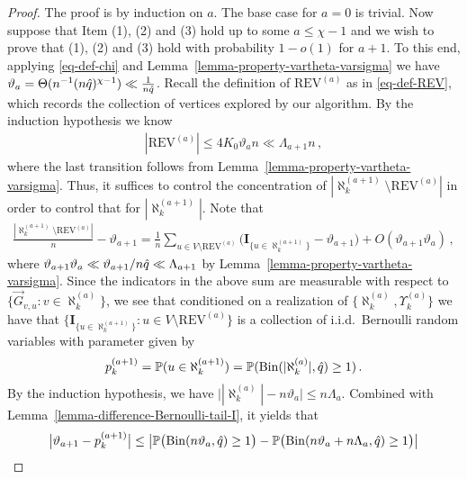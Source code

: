 \documentclass[11pt]{article}
\numberwithin{equation}{section}
\begin{document}
\begin{proof}
The proof is by induction on $a$. The base case for $a=0$ is trivial. Now suppose that Item (1), (2) and (3) hold up to some $a \leq \chi-1$ and we wish to prove that (1), (2) and (3) hold with probability $1-o(1)$ for $a+1$. To this end, applying \eqref{eq-def-chi} and Lemma~\ref{lemma-property-vartheta-varsigma} we have $\vartheta_a = \Theta( n^{-1} (n \Hat{q})^{\chi-1} ) \ll \frac{1}{n\Hat{q}}$. Recall the definition of $\mathrm{REV}^{(a)}$ as in \eqref{eq-def-REV}, which records the collection of vertices explored by our algorithm. By the induction hypothesis we know 
\begin{align}\label{eq-REV-approximation}
   |\mathrm{REV}^{(a)}| \leq 4K_0 \vartheta_a n \ll \Lambda_{a+1} n \,,
\end{align}
where the last transition follows from Lemma~\ref{lemma-property-vartheta-varsigma}.
Thus, it suffices to control the concentration of $|\aleph^{(a+1)}_k \setminus \mathrm{REV}^{(a)}|$ in order to control that for $|\aleph^{(a+1)}_k|$. Note that
\begin{align*}
    \frac{|\aleph^{(a+1)}_k \setminus \mathrm{REV}^{(a)}|}{n} - \vartheta_{a+1} = \frac{1}{n} \sum_{ u \in V \setminus \mathrm{REV}^{(a)} }  \Big( \mathbf{I}_{ \{ u \in \aleph^{(a+1)}_k \} } - \vartheta_{a+1} \Big) + O(\vartheta_{a+1} \vartheta_a) \,,
\end{align*}
where $\vartheta_{a+1} \vartheta_a \ll \vartheta_{a+1}/ n\Hat{q} \ll \Lambda_{a+1}$ by Lemma~\ref{lemma-property-vartheta-varsigma}. Since the indicators in the above sum are measurable with respect to $\{ \overrightarrow{G}_{v,u} : v \in \aleph^{(a)}_k\}$, we see that conditioned on a realization of $\{ \aleph^{(a)}_k, \Upsilon^{(a)}_k \}$ we have that $\{ \mathbf{I}_{ \{ u \in \aleph^{(a+1)}_k \} } : u \in V \setminus \mathrm{REV}^{(a)}\}$ is a collection of i.i.d.\ Bernoulli random variables with parameter given by
\begin{align*}
    p^{(a+1)}_{k} = \mathbb{P}( u \in \aleph^{(a+1)}_k ) = \mathbb{P}( \mathrm{Bin} (|\aleph^{(a)}_k|, \Hat{q}) \geq 1 ) \,.
\end{align*}
By the induction hypothesis, we have $\big| |\aleph^{(a)}_k| - n \vartheta_a \big| \leq n \Lambda_{a}$. Combined with Lemma~\ref{lemma-difference-Bernoulli-tail-I}, it yields that
\begin{align}
    & \big| \vartheta_{a+1} - p^{(a+1)}_{k} \big| \leq \big| \mathbb{P} \big(\mathrm{Bin} (n\vartheta_a, \Hat{q}) \geq 1 \big) - \mathbb{P} \big( \mathrm{Bin} (n\vartheta_a + n \Lambda_{a}, \Hat{q}) \geq 1 \big) \big| \nonumber \\

\end{align}
\end{proof}
\end{document}
